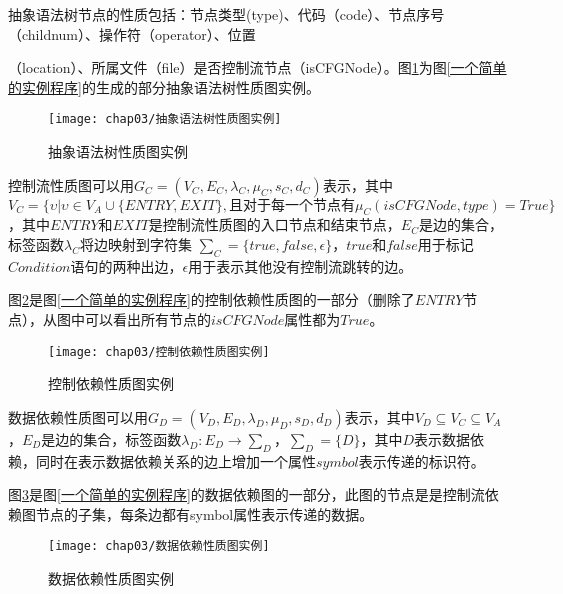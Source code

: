 抽象语法树节点的性质包括：节点类型{(type)}、代码{（code）}、节点序号{（childnum）}、操作符{（operator）}、位置{（location）、所属文件{（file）}是否控制流节点{（isCFGNode）}。图\ref{抽象语法树性质图实例}为图\ref{一个简单的实例程序}的生成的部分抽象语法树性质图实例。

\begin{figure}[htp]
\centering
\texttt{[image: chap03/抽象语法树性质图实例]}
\caption{抽象语法树性质图实例}
\label{抽象语法树性质图实例}
\end{figure}

\begin{definition}
\label{控制流性质图定义}
控制流性质图可以用$G _{C}=(V_{C},E_{C},\lambda _{C}, \mu _{C}, s _{C}, d _{C})$表示，其中$V_{C}=\{ \upsilon | \upsilon \in V_{A} \cup \{ENTRY,EXIT\},\text{且} 对于每一个节点有\mu_C(isCFGNode, type)=True \}$，其中$ENTRY$和$EXIT$是控制流性质图的入口节点和结束节点，$E_{C}$是边的集合，标签函数$\lambda_C$将边映射到字符集 $\sum_C=\{true, false, \epsilon \}$，$true$和$false$用于标记$Condition$语句的两种出边，$\epsilon$用于表示其他没有控制流跳转的边。
\end{definition}

图\ref{控制依赖性质图实例}是图\ref{一个简单的实例程序}的控制依赖性质图的一部分（删除了$ENTRY$节点），从图中可以看出所有节点的$isCFGNode$属性都为$True$。

\begin{figure}[htp]
\centering
\texttt{[image: chap03/控制依赖性质图实例]}
\caption{控制依赖性质图实例}
\label{控制依赖性质图实例}
\end{figure}

\begin{definition}
\label{数据依赖性质图定义}
数据依赖性质图可以用$G _{D}=(V_{D},E_{D},\lambda _{D}, \mu _{D}, s _{D}, d _{D})$表示，其中$V_{D} \subseteq V_C \subseteq V_A$，$E_{D}$是边的集合，标签函数$\lambda_{D} : E_{D} \rightarrow \sum_{D}$，$\sum_{D} = \{D\}$，其中$D$表示数据依赖，同时在表示数据依赖关系的边上增加一个属性$symbol$表示传递的标识符。
\end{definition}

图\ref{数据依赖性质图实例}是图\ref{一个简单的实例程序}的数据依赖图的一部分，此图的节点是是控制流依赖图节点的子集，每条边都有symbol属性表示传递的数据。

\begin{figure}[htp]
\centering
\texttt{[image: chap03/数据依赖性质图实例]}
\caption{数据依赖性质图实例}
\label{数据依赖性质图实例}
\end{figure}

}
